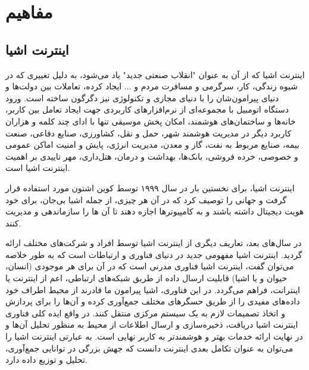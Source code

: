 \chapter{مفاهیم}
\section{اینترنت اشیا}
اینترنت اشیا که از آن به عنوان "انقلاب صنعتی جدید" یاد می‌شود، به دلیل تغییری که در شیوه
زندگی، کار، سرگرمی و مسافرت مردم و ... ایجاد کرده، تعاملات بین دولت‌ها و دنیای پیرامون‌شان را با دنیای مجازی و تكنولوژی نیز دگرگون ساخته است. ورود دستگاه اتومبیل با مجموعه‌ای از نرم‌افزارهای کاربردی جهت ایجاد تعامل بین کاربر، خانه‌ها و ساختمان‌های هوشمند، امكان پخش موسیقی تنها با ادای چند کلمه و هزاران کاربرد دیگر در مدیریت هوشمند شهر، حمل و نقل، کشاورزی، صنایع دفاعی،
صنعت بیمه، صنایع مربوط به نفت، گاز و معدن، مدیریت انرژی، پایش و امنیت اماکن عمومی و
خصوصی، خرده فروشی، بانک‌ها، بهداشت و درمان، هتل‌داری، مهر تاییدی بر اهمیت اینترنت اشیا است.


اینترنت اشیا، برای نخستین بار در سال ۱۹۹۹ توسط کوین اشتون مورد استفاده قرار گرفت و جهانی را توصیف کرد که در آن هر چیزی، از جمله اشیا بی‌جان، برای خود هویت دیجیتال داشته باشند و به کامپیوترها اجازه دهند تا آن ها را سازماندهی و مدیریت کنند.


در سال‌های بعد، تعاریف دیگری از اینترنت اشیا توسط افراد و شرکت‌های مختلف ارائه گردید. اینترنت اشیا مفهومی جدید در دنیای فناوری و ارتباطات است که به طور خلاصه می‌توان گفت، اینترنت اشیا فناوری مدرنی است که در آن برای هر موجودی (انسان، حیوان و یا اشیا) قابلیت ارسال داده از طریق شبكه‌های ارتباطی، اعم از اینترنت یا اینترانت، فراهم می‌گردد. در این فناوری، اشیا پیرامون ما قادرند از محیط اطراف خود داده‌های مفیدی را از طریق حسگرهای مختلف جمع‌آوری کرده و آن‌ها را برای پردازش و اتخاذ تصمیمات لازم به یک سیستم مرکزی منتقل کنند. در واقع ایده کلی فناوری اینترنت اشیا دریافت، ذخیره‌سازی و ارسال اطلاعات از محیط به منظور تحلیل آن‌ها و در نهایت ارائه خدمات بهتر و هوشمندتر به کاربر نهایی است. به عبارتی اینترنت اشیا را می‌توان به عنوان تكامل بعدی اینترنت دانست که جهش بزرگی در توانایی جمع‌آوری، تحلیل و توزیع داده دارد.